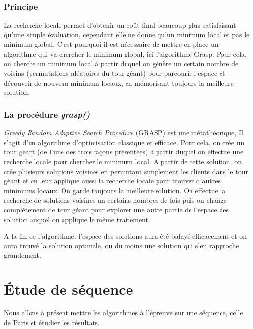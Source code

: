 \documentclass[12pt]{article}
\begin{document}
	\subsubsection{Principe}
	La recherche locale permet d'obtenir un coût final beaucoup plus satisfaisant qu'une simple évaluation, cependant elle ne donne qu'un minimum local et pas le minimum global. C'est pourquoi il est nécessaire de mettre en place un algorithme qui va chercher le minimum global, ici l'algorithme Grasp. Pour cela, on cherche un minimum local à partir duquel on génère un certain nombre de voisins (permutations aléatoires du tour géant) pour parcourir l'espace et découvrir de nouveau minimum locaux, en mémorisant toujours la meilleure solution.
	\subsubsection{La procédure \emph{grasp()}}
	\emph{Greedy Random Adaptive Search Procedure }(GRASP) est une métathéorique, Il s'agit d'un algorithme d'optimisation classique et efficace. Pour cela, on crée un tour géant (de l'une des trois façons présentées) à partir duquel on effectue une recherche locale pour chercher le minimum local. A partir de cette solution, on crée plusieurs solutions voisines en permutant simplement les clients dans le tour géant et on leur applique aussi la recherche locale pour trouver d'autres minimums locaux. On garde toujours la meilleure solution. On effectue la recherche de solutions voisines un certains nombres de fois puis on change complètement de tour géant pour explorer une autre partie de l'espace des solution auquel on applique le même traitement.\\\par
    A la fin de l'algorithme, l'espace des solutions aura été balayé efficacement et on aura trouvé la solution optimale, ou du moins une solution qui s'en rapproche grandement.
	
	\section{Étude de séquence}
	Nous allons à présent mettre les algorithmes à l'épreuve sur une séquence, celle de Paris et étudier les résultats.\par
\end{document}
